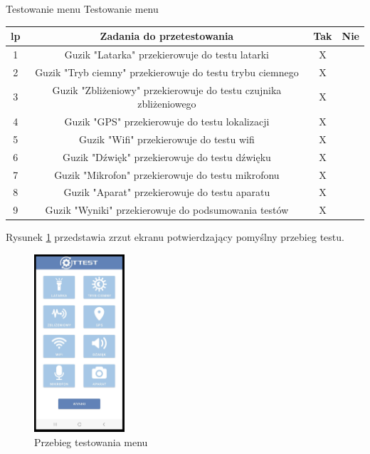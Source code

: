 \begin{tabela}
	{Testowanie menu}	%
	{Testowanie menu}	%
	{
		\begin{tabular}{|c|c|c|c|} \hline
			\textbf{lp} & \textbf{Zadania do przetestowania} & \textbf{Tak} & \textbf{Nie} \\ \hline
			1 & Guzik "Latarka" przekierowuje do testu latarki & X & ~ \\ \hline
			2 & Guzik "Tryb ciemny" przekierowuje do testu trybu ciemnego & X & ~ \\ \hline
			3 & Guzik "Zbliżeniowy" przekierowuje do testu czujnika zbliżeniowego & X & ~ \\ \hline
			4 & Guzik "GPS" przekierowuje do testu lokalizacji & X & ~ \\ \hline
			5 & Guzik "Wifi" przekierowuje do testu wifi & X & ~ \\ \hline
			6 & Guzik "Dźwięk" przekierowuje do testu dźwięku & X & ~ \\ \hline
			7 & Guzik "Mikrofon" przekierowuje do testu mikrofonu & X & ~ \\ \hline
			8 & Guzik "Aparat" przekierowuje do testu aparatu & X & ~ \\ \hline
			9 & Guzik "Wyniki" przekierowuje do podsumowania testów & X & ~ \\ \hline
	\end{tabular}	}
	\label{tab:tablica_menu}
\end{tabela}

Rysunek \ref{rys:menu} przedstawia zrzut ekranu potwierdzający pomyślny przebieg testu.

\begin{figure}[!hbt]
	\begin{center}
		\includegraphics[angle=360, width=0.30\textwidth]{rys/punkt5/menu.png}
		\caption{Przebieg testowania menu}
		\label{rys:menu}
	\end{center}
\end{figure}   

